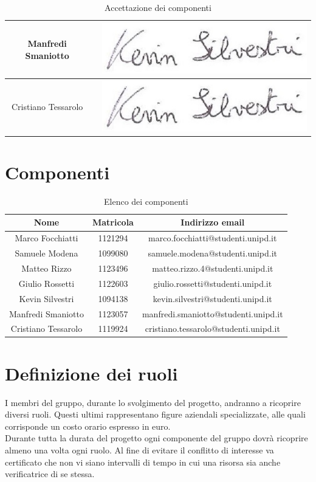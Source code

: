 \documentclass[./PianodiProgetto.tex]{subfiles}
\begin{document}
\begin{table}[H]
\begin{tabular}{|c|c|c|}
		Manfredi Smaniotto& \@date &\includegraphics[scale=0.5]{img/firme/SilvestriKevin} \\ \hline
		Cristiano Tessarolo& \@date &\includegraphics[scale=0.5]{img/firme/SilvestriKevin} \\  
		\hline
	\end{tabular}
	\caption{Accettazione dei componenti}
\end{table}

\section{Componenti}
\begin{table}[H]
	\begin{tabular}{|c|c|c|}
	\hline
	Nome&Matricola&Indirizzo email \\ \hline
	Marco Focchiatti&1121294&marco.focchiatti@studenti.unipd.it  \\ \hline
	Samuele Modena&1099080&samuele.modena@studenti.unipd.it \\ \hline
	Matteo Rizzo&1123496&matteo.rizzo.4@studenti.unipd.it \\ \hline
	Giulio Rossetti&1122603&giulio.rossetti@studenti.unipd.it \\ \hline
	Kevin Silvestri&1094138&kevin.silvestri@studenti.unipd.it \\ \hline
	Manfredi Smaniotto&1123057&manfredi.smaniotto@studenti.unipd.it \\ \hline
	Cristiano Tessarolo&1119924&cristiano.tessarolo@studenti.unipd.it \\  
	\hline
	\end{tabular}
\caption{Elenco dei componenti}
\end{table}

\section{Definizione dei ruoli}
I membri del gruppo, durante lo svolgimento del progetto, andranno a ricoprire diversi ruoli. Questi ultimi rappresentano figure aziendali specializzate, alle quali corrisponde un costo orario espresso in euro. \\
Durante tutta la durata del progetto ogni componente del gruppo dovrà ricoprire almeno una volta ogni ruolo. Al fine di evitare il conflitto di interesse va certificato che non vi siano intervalli di tempo in cui una risorsa sia anche verificatrice di se stessa.
\end{document}
